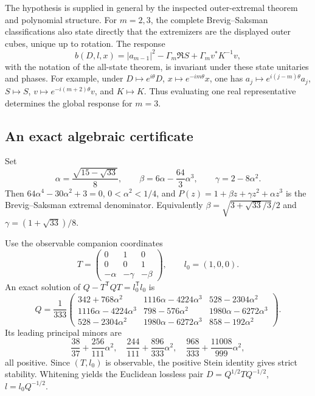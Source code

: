 The hypothesis is supplied in general by the inspected outer-extremal
theorem and polynomial structure.  For $m=2,3$, the complete
Brevig--Saksman classifications also state directly that the
extremizers are the displayed outer cubes, unique up to rotation.
The response
\begin{equation}
 b(D,l,x)=|a_{m-1}|^2-\Gamma_m\Re S
                         +\Gamma_m v^*K^{-1}v,
 \label{I:R:eq:four-state-response-recalled}
\end{equation}
with the notation of the all-state theorem, is invariant under these
state unitaries and phases.  For example, under
$D\mapsto e^{i\theta}D$, $x\mapsto e^{-im\theta}x$, one has
$a_j\mapsto e^{i(j-m)\theta}a_j$, $S\mapsto S$,
$v\mapsto e^{-i(m+2)\theta}v$, and $K\mapsto K$.
Thus evaluating one real representative determines the global
response for $m=3$.

\subsection{An exact algebraic certificate}

Set
\begin{equation}
 \alpha=\frac{\sqrt{15-\sqrt{33}}}{8},\qquad
 \beta=6\alpha-\frac{64}{3}\alpha^3,
 \qquad\gamma=2-8\alpha^2.
 \label{I:R:eq:four-state-alpha}
\end{equation}
Then $64\alpha^4-30\alpha^2+3=0$, $0<\alpha^2<1/4$, and
$P(z)=1+\beta z+\gamma z^2+\alpha z^3$ is the
Brevig--Saksman extremal denominator.  Equivalently
$\beta=\sqrt{3+\sqrt{33}/3}/2$ and
$\gamma=(1+\sqrt{33})/8$.

Use the observable companion coordinates
\[
 T=\begin{pmatrix}0&1&0\\0&0&1\\-\alpha&-\gamma&-\beta\end{pmatrix},
 \qquad l_0=(1,0,0).
\]
An exact solution of $Q-T^{\mathsf T}QT=l_0^{\mathsf T}l_0$ is
\begin{equation}
 Q=\frac1{333}
 \begin{pmatrix}
 342+768\alpha^2&1116\alpha-4224\alpha^3&528-2304\alpha^2\\
 1116\alpha-4224\alpha^3&798-576\alpha^2&1980\alpha-6272\alpha^3\\
 528-2304\alpha^2&1980\alpha-6272\alpha^3&858-192\alpha^2
 \end{pmatrix}.
 \label{I:R:eq:four-state-Q}
\end{equation}
Its leading principal minors are
\[
 \frac{38}{37}+\frac{256}{111}\alpha^2,\quad
 \frac{244}{111}+\frac{896}{333}\alpha^2,\quad
 \frac{968}{333}+\frac{11008}{999}\alpha^2,
\]
all positive.  Since $(T,l_0)$ is observable, the positive Stein
identity gives strict stability.  Whitening yields the Euclidean
lossless pair $D=Q^{1/2}TQ^{-1/2}$, $l=l_0Q^{-1/2}$.

